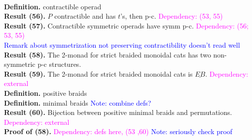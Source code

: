 \documentclass{amsart}
\newcommand{\ul}{\underline}
\begin{document}
\\ \textbf{Definition.} contractible operad
\\ \textbf{Result (56).} $P$ contractible and has $t$'s, then p-c. \textcolor{magenta}{Dependency: (53, 55)}
\\ \textbf{Result (57).} Contractible symmetric operads have symm p-c. \textcolor{magenta}{Dependency: (56; 53, 55)}
\\ \textcolor{blue}{Remark about symmetrization not preserving contractibility doesn't read well}
\\ \textbf{Result (58).} The 2-monad for strict braided monoidal cats has two non-symmetric p-c structures.
\\ \textbf{Result (59).} The 2-monad for strict braided monoidal cats is $\ul{EB}$.   \textcolor{magenta}{Dependency: external}
\\ \textbf{Definition.} positive braids
\\ \textbf{Definition.} minimal braids \textcolor{blue}{Note: combine defs?}
\\ \textbf{Result (60).} Bijection between positive minimal braids and permutations.   \textcolor{magenta}{Dependency: external}
\\ \textbf{Proof of (58).} \textcolor{magenta}{Dependency: defs here, (53 ,60)} \textcolor{blue}{Note: seriously check proof}
\end{document}
